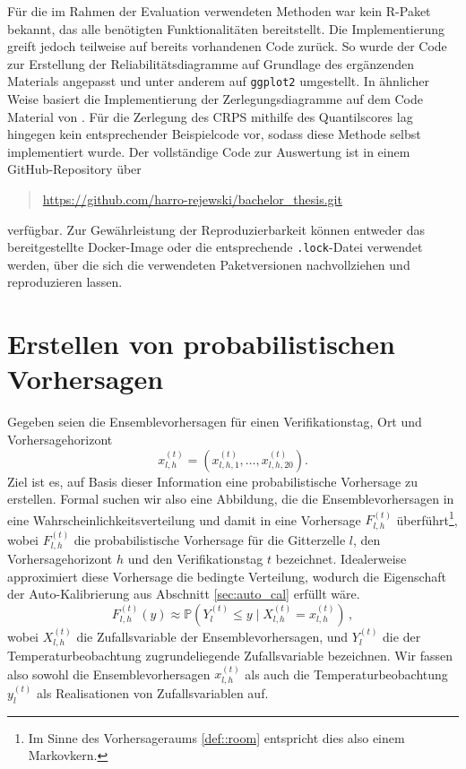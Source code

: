 Für die im Rahmen der Evaluation verwendeten Methoden war kein R-Paket bekannt, das alle benötigten Funktionalitäten bereitstellt. Die Implementierung greift jedoch teilweise auf bereits vorhandenen Code zurück. So wurde der Code zur Erstellung der Reliabilitätsdiagramme auf Grundlage des ergänzenden Materials \textcite{gneiting2023supp} angepasst und unter anderem auf \texttt{ggplot2} umgestellt. In ähnlicher Weise basiert die Implementierung der Zerlegungsdiagramme auf dem Code Material von \textcite{gneiting2023model}. Für die Zerlegung des CRPS mithilfe des Quantilscores lag hingegen kein entsprechender Beispielcode vor, sodass diese Methode selbst implementiert wurde. Der vollständige Code zur Auswertung ist in einem GitHub-Repository über
\begin{quote}
    \url{https://github.com/harro-rejewski/bachelor_thesis.git}
\end{quote}
verfügbar. Zur Gewährleistung der Reproduzierbarkeit können entweder das bereitgestellte Docker-Image oder die entsprechende \texttt{.lock}-Datei verwendet werden, über die sich die verwendeten Paketversionen nachvollziehen und reproduzieren lassen.


\section{Erstellen von probabilistischen Vorhersagen}\label{sec:pre_postproc}
Gegeben seien die Ensemblevorhersagen für einen Verifikationstag, Ort und Vorhersagehorizont
\[
x_{l,h}^{(t)}=\left(x_{l,h,1}^{(t)},\dots,x_{l,h,20}^{(t)}\right).
\]
Ziel ist es, auf Basis dieser Information eine probabilistische Vorhersage zu erstellen. Formal suchen wir also eine Abbildung, die die Ensemblevorhersagen in eine Wahrscheinlichkeitsverteilung und damit in eine Vorhersage $F^{(t)}_{l,h}$ überführt\footnote{Im Sinne des Vorhersageraums \ref{def::room} entspricht dies also einem Markovkern.}, wobei $F_{l,h}^{(t)}$ die probabilistische Vorhersage für die Gitterzelle $l$, den Vorhersagehorizont $h$ und den Verifikationstag $t$ bezeichnet. Idealerweise approximiert diese Vorhersage die bedingte Verteilung, wodurch die Eigenschaft der Auto-Kalibrierung aus Abschnitt \ref{sec:auto_cal} erfüllt wäre.
\[
F^{(t)}_{l,h}(y) \approx \mathbb{P}(Y^{(t)}_{l}\le y \mid X_{l,h}^{(t)}=x^{(t)}_{l,h})\,,
\]
wobei $X_{l,h}^{(t)}$ die Zufallsvariable der Ensemblevorhersagen, und  $Y^{(t)}_{l}$ die der Temperaturbeobachtung zugrundeliegende Zufallsvariable bezeichnen. Wir fassen also sowohl die Ensemblevorhersagen $x_{l,h}^{(t)}$ als auch die Temperaturbeobachtung $y^{(t)}_{l}$ als Realisationen von Zufallsvariablen auf. 

